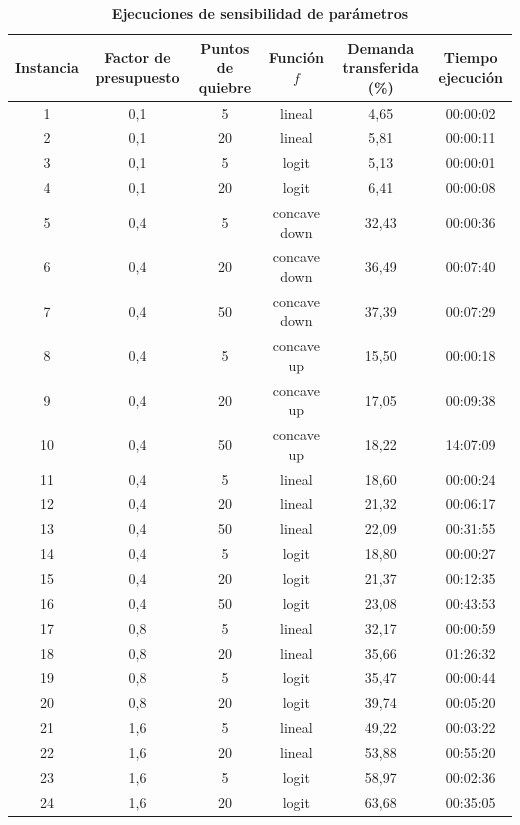 \documentclass{article}
\begin{document}
  \begin{table}
    \centering
    \caption*{{\bf Ejecuciones de sensibilidad de parámetros}}
    \begin{tabular}{cccccc}
        \toprule
        Instancia & Factor de presupuesto & Puntos de quiebre & Función $f$ & Demanda transferida (\%) & Tiempo ejecución \\
        \midrule
        1 & 0,1 & 5 & lineal & 4,65 & 00:00:02 \\
        2 & 0,1 & 20 & lineal & 5,81 & 00:00:11 \\
        3 & 0,1 & 5 & logit & 5,13 & 00:00:01 \\
        4 & 0,1 & 20 & logit & 6,41 & 00:00:08 \\
        5 & 0,4 & 5 & concave down & 32,43 & 00:00:36 \\
        6 & 0,4 & 20 & concave down & 36,49 & 00:07:40 \\
        7 & 0,4 & 50 & concave down & 37,39 & 00:07:29 \\
        8 & 0,4 & 5 & concave up & 15,50 & 00:00:18 \\
        9 & 0,4 & 20 & concave up & 17,05 & 00:09:38 \\
        10 & 0,4 & 50 & concave up & 18,22 & 14:07:09 \\
        11 & 0,4 & 5 & lineal & 18,60 & 00:00:24 \\
        12 & 0,4 & 20 & lineal & 21,32 & 00:06:17 \\
        13 & 0,4 & 50 & lineal & 22,09 & 00:31:55 \\
        14 & 0,4 & 5 & logit & 18,80 & 00:00:27 \\
        15 & 0,4 & 20 & logit & 21,37 & 00:12:35 \\
        16 & 0,4 & 50 & logit & 23,08 & 00:43:53 \\
        17 & 0,8 & 5 & lineal & 32,17 & 00:00:59 \\
        18 & 0,8 & 20 & lineal & 35,66 & 01:26:32 \\
        19 & 0,8 & 5 & logit & 35,47 & 00:00:44 \\
        20 & 0,8 & 20 & logit & 39,74 & 00:05:20 \\
        21 & 1,6 & 5 & lineal & 49,22 & 00:03:22 \\
        22 & 1,6 & 20 & lineal & 53,88 & 00:55:20 \\
        23 & 1,6 & 5 & logit & 58,97 & 00:02:36 \\
        24 & 1,6 & 20 & logit & 63,68 & 00:35:05 \\

\end{tabular}
\end{table}
\end{document}
